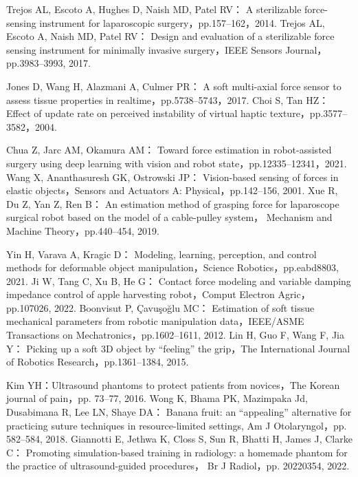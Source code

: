\documentclass[a4paper]{jarticle}
\begin{document}
\begin{thebibliography}{9}
    Trejos AL, Escoto A, Hughes D, Naish MD, Patel RV：
    A sterilizable force-sensing instrument for laparoscopic surgery，pp.157–162，2014.
    Trejos AL, Escoto A, Naish MD, Patel RV：
    Design and evaluation of a sterilizable force sensing instrument for minimally invasive surgery，IEEE Sensors Journal，pp.3983–3993, 2017.


    Jones D, Wang H, Alazmani A, Culmer PR：
    A soft multi-axial force sensor to assess tissue properties in realtime，pp.5738–5743，2017.
    Choi S, Tan HZ：
    Effect of update rate on perceived instability of virtual haptic texture，pp.3577–3582，2004.

    Chua Z, Jarc AM, Okamura AM：
    Toward force estimation in robot-assisted surgery using deep learning with vision and robot state，pp.12335–12341，2021.
    Wang X, Ananthasuresh GK, Ostrowski JP：
    Vision-based sensing of forces in elastic objects，Sensors and Actuators A: Physical，pp.142–156, 2001.
    Xue R, Du Z, Yan Z, Ren B：
    An estimation method of grasping force for laparoscope surgical robot based on the model of a cable-pulley system，
    Mechanism and Machine Theory，pp.440–454, 2019.


    Yin H, Varava A, Kragic D：
    Modeling, learning, perception, and control methods for deformable object manipulation，Science Robotics，pp.eabd8803, 2021.
    Ji W, Tang C, Xu B, He G：
    Contact force modeling and variable damping impedance control of apple harvesting robot，Comput Electron Agric，pp.107026, 2022.
    Boonvisut P, Çavuşoğlu MC：
    Estimation of soft tissue mechanical parameters from robotic manipulation data，IEEE/ASME Transactions on Mechatronics，pp.1602–1611, 2012.
    Lin H, Guo F, Wang F, Jia Y：
    Picking up a soft 3D object by “feeling” the grip，The International Journal of Robotics Research，pp.1361–1384, 2015.

    Kim YH：Ultrasound phantoms to protect patients from novices，The Korean journal of pain，pp. 73–77, 2016.
    Wong K, Bhama PK, Mazimpaka Jd, Dusabimana R, Lee LN, Shaye DA：
    Banana fruit: an “appealing” alternative for practicing suture techniques in resource-limited settings, 
    Am J Otolaryngol，pp. 582–584, 2018.
    Giannotti E, Jethwa K, Closs S, Sun R, Bhatti H, James J, Clarke C：
    Promoting simulation-based training in radiology: a homemade phantom for the practice of ultrasound-guided procedures，
    Br J Radiol，pp. 20220354, 2022.




    

\end{thebibliography}
\end{document}
